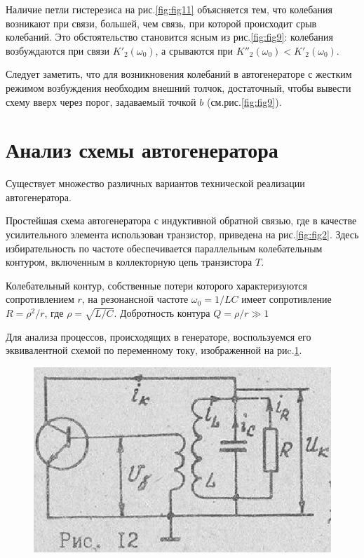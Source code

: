 Наличие петли гистерезиса на рис.\ref{fig:fig11} объясняется тем, что колебания возникают при связи, большей, чем связь, при которой происходит срыв колебаний. Это обстоятельство становится ясным из рис.\ref{fig:fig9}: колебания возбуждаются при связи $K'_2(\omega_0)$, а срываются при $K''_2(\omega_0)<K'_2(\omega_0)$.

Следует заметить, что для возникновения колебаний в автогенераторе с жестким режимом возбуждения необходим внешний толчок, достаточный, чтобы вывести схему вверх через порог, задаваемый точкой $b$ (см.рис.\ref{fig:fig9}).

\section{Анализ схемы автогенератора}

Существует множество различных вариантов технической реализации автогенератора.

Простейшая схема автогенератора с индуктивной обратной связью, где в качестве усилительного элемента использован транзистор, приведена на рис.\ref{fig:fig2}. Здесь избирательность по частоте обеспечивается параллельным колебательным контуром, включенным в коллекторную цепь транзистора $T$.

Колебательный контур, собственные потери которого характеризуются сопротивлением $r$, на резонансной частоте $\omega_0=1/{LC}$ имеет сопротивление $R=\rho^2/r$, где $\rho=\sqrt{L/C}$. Добротность контура $Q=\rho/r\gg1$

Для анализа процессов, происходящих в генераторе, воспользуемся его эквивалентной схемой по переменному току, изображенной на риc.\ref{fig:fig12}.

\begin{figure}[h]
	\centering
	\includegraphics[width=0.7\linewidth]{circuit/12.jpg}
	\caption{}
	\label{fig:fig12}
\end{figure}

